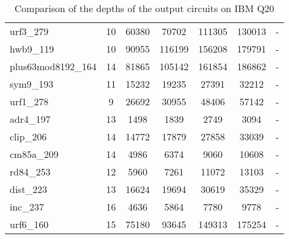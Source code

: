 \documentclass[journal]{IEEEtran}
\begin{document}
\begin{table*}[!th]
\begin{center}
\begin{tabular}{|p{4.3cm}<{\centering}|c|c|c|c|c|c|}
urf3\_279 & 10 & 60380 & 70702 & 111305 & 130013 & - \\ 
hwb9\_119 & 10 & 90955 & 116199 & 156208 & 179791 & - \\ 
plus63mod8192\_164 & 14 & 81865 & 105142 & 161854 & 186862 & - \\ 
sym9\_193 & 11 & 15232 & 19235 & 27391 & 32212 & - \\ 
urf1\_278 & 9 & 26692 & 30955 & 48406 & 57142 & - \\ 
adr4\_197 & 13 & 1498 & 1839 & 2749 & 3094 & - \\ 
clip\_206 & 14 & 14772 & 17879 & 27858 & 33039 & - \\ 
cm85a\_209 & 14 & 4986 & 6374 & 9060 & 10608 & - \\ 
rd84\_253 & 12 & 5960 & 7261 & 11072 & 13103 & - \\ 
dist\_223 & 13 & 16624 & 19694 & 30619 & 35329 & - \\ 
inc\_237 & 16 & 4636 & 5864 & 7780 & 9778 & - \\ 
urf6\_160 & 15 & 75180 & 93645 & 149313 & 175254 & - \\
                           \hline
                          
                    \end{tabular} 
                  \end{center}					
                    \caption{Comparison of  the depths of the output circuits on  IBM Q20} 
                    \label{tab8}
                \end{table*}	
\end{document}
